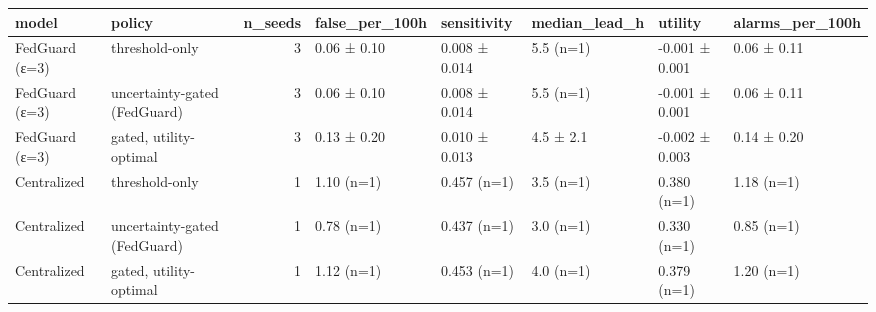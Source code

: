 \begin{tabular}{llrlllll}
\toprule
model & policy & n\_seeds & false\_per\_100h & sensitivity & median\_lead\_h & utility & alarms\_per\_100h \\
\midrule
FedGuard (ε=3) & threshold-only & 3 & 0.06 ± 0.10 & 0.008 ± 0.014 & 5.5 (n=1) & -0.001 ± 0.001 & 0.06 ± 0.11 \\
FedGuard (ε=3) & uncertainty-gated (FedGuard) & 3 & 0.06 ± 0.10 & 0.008 ± 0.014 & 5.5 (n=1) & -0.001 ± 0.001 & 0.06 ± 0.11 \\
FedGuard (ε=3) & gated, utility-optimal & 3 & 0.13 ± 0.20 & 0.010 ± 0.013 & 4.5 ± 2.1 & -0.002 ± 0.003 & 0.14 ± 0.20 \\
Centralized & threshold-only & 1 & 1.10 (n=1) & 0.457 (n=1) & 3.5 (n=1) & 0.380 (n=1) & 1.18 (n=1) \\
Centralized & uncertainty-gated (FedGuard) & 1 & 0.78 (n=1) & 0.437 (n=1) & 3.0 (n=1) & 0.330 (n=1) & 0.85 (n=1) \\
Centralized & gated, utility-optimal & 1 & 1.12 (n=1) & 0.453 (n=1) & 4.0 (n=1) & 0.379 (n=1) & 1.20 (n=1) \\
\bottomrule
\end{tabular}
